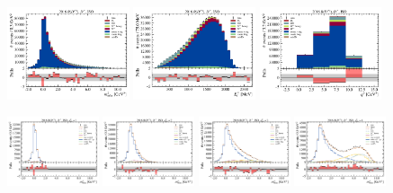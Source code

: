 \begin{figure}[htb]
    \centering
    \includegraphics[width=0.32\textwidth]{./figs-fit-fit-results/sig-fit/stacked/fit_result-stacked-Dst-iso-mmiss2.pdf}
    \includegraphics[width=0.32\textwidth]{./figs-fit-fit-results/sig-fit/stacked/fit_result-stacked-Dst-iso-el.pdf}
    \includegraphics[width=0.32\textwidth]{./figs-fit-fit-results/sig-fit/stacked/fit_result-stacked-Dst-iso-q2.pdf}

    \includegraphics[width=0.24\textwidth]{./figs-fit-fit-results/sig-fit/lines_q2_slices/fit_result-lines_q2_idx1-Dst-iso-mmiss2.pdf}
    \includegraphics[width=0.24\textwidth]{./figs-fit-fit-results/sig-fit/lines_q2_slices/fit_result-lines_q2_idx2-Dst-iso-mmiss2.pdf}
    \includegraphics[width=0.24\textwidth]{./figs-fit-fit-results/sig-fit/lines_q2_slices/fit_result-lines_q2_idx3-Dst-iso-mmiss2.pdf}
    \includegraphics[width=0.24\textwidth]{./figs-fit-fit-results/sig-fit/lines_q2_slices/fit_result-lines_q2_idx4-Dst-iso-mmiss2.pdf}


\end{figure}
